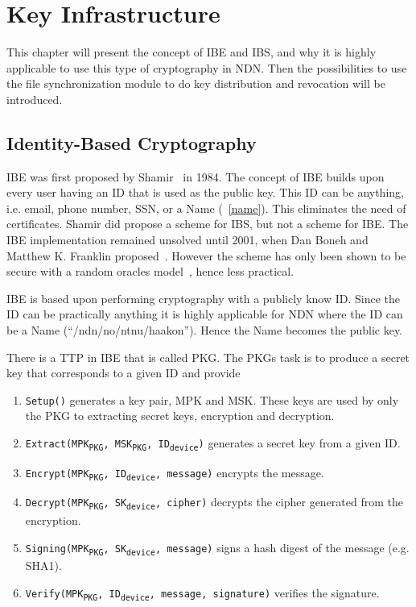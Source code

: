 \chapter{Key Infrastructure}
This chapter will present the concept of \gls{IBE} and \gls{IBS}, and why it is highly applicable to use this type of cryptography in \gls{NDN}. 
Then the possibilities to use the file synchronization module to do key distribution and revocation will be introduced.

\section{Identity-Based Cryptography}\label{ibc}
\gls{IBE} was first proposed by Shamir~\cite{DBLP:conf/crypto/Shamir84} in 1984. 
The concept of \gls{IBE} builds upon every user having an \gls{ID} that is used as the public key. 
This \gls{ID} can be anything, i.e. email, phone number, \gls{SSN}, or a Name (~\autoref{name}).
This eliminates the need of certificates.
Shamir did propose a scheme for \gls{IBS}, but not a scheme for \gls{IBE}. 
The \gls{IBE} implementation remained unsolved until 2001, when Dan Boneh and Matthew K. Franklin proposed~\cite{DBLP:conf/crypto/BonehF01}.
However the scheme has only been shown to be secure with a random oracles model~\cite{DBLP:journals/iacr/Waters04}, hence less practical.


\gls{IBE} is based upon performing cryptography with a publicly know \gls{ID}.
Since the \gls{ID} can be practically anything it is highly applicable for \gls{NDN} where the \gls{ID} can be a Name (``/ndn/no/ntnu/haakon'').
Hence the Name becomes the public key. 

There is a \gls{TTP} in \gls{IBE} that is called \gls{PKG}.
The \gls{PKG}s task is to produce a secret key that corresponds to a given ID and provide 

\begin{enumerate}\label{ibc-methods}
  \item \texttt{Setup()} generates a key pair, \gls{MPK} and \gls{MSK}. These keys are used by only the \gls{PKG} to extracting secret keys, encryption and decryption.
  \item \texttt{Extract(MPK\textsubscript{PKG}, MSK\textsubscript{PKG}, ID\textsubscript{device})} generates a secret key from a given ID. 
  \item \texttt{Encrypt(MPK\textsubscript{PKG}, ID\textsubscript{device}, message)} encrypts the message.
  \item \texttt{Decrypt(MPK\textsubscript{PKG}, SK\textsubscript{device}, cipher)} decrypts the cipher generated from the encryption.
  \item \texttt{Signing(MPK\textsubscript{PKG}, SK\textsubscript{device}, message)} signs a hash digest of the message (e.g. \gls{SHA1}).
  \item \texttt{Verify(MPK\textsubscript{PKG}, ID\textsubscript{device}, message, signature)} verifies the signature.
\end{enumerate}

